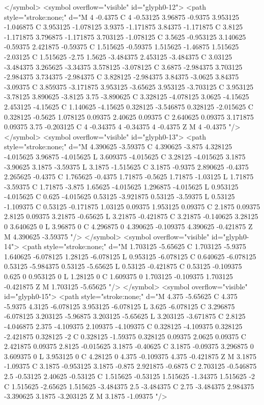 </symbol>
<symbol overflow="visible" id="glyph0-12">
<path style="stroke:none;" d="M 4 -0.4375 C 4 -0.53125 3.96875 -0.9375 3.953125 -1.046875 C 3.953125 -1.078125 3.9375 -1.171875 3.84375 -1.171875 C 3.8125 -1.171875 3.796875 -1.171875 3.703125 -1.078125 C 3.5625 -0.953125 3.140625 -0.59375 2.421875 -0.59375 C 1.515625 -0.59375 1.515625 -1.46875 1.515625 -2.03125 C 1.515625 -2.75 1.5625 -3.484375 2.453125 -3.484375 C 3.03125 -3.484375 3.265625 -3.34375 3.578125 -3.078125 C 3.6875 -2.984375 3.703125 -2.984375 3.734375 -2.984375 C 3.828125 -2.984375 3.84375 -3.0625 3.84375 -3.09375 C 3.859375 -3.171875 3.953125 -3.65625 3.953125 -3.703125 C 3.953125 -3.78125 3.890625 -3.8125 3.75 -3.890625 C 3.328125 -4.078125 3.0625 -4.15625 2.453125 -4.15625 C 1.140625 -4.15625 0.328125 -3.546875 0.328125 -2.015625 C 0.328125 -0.5625 1.078125 0.09375 2.40625 0.09375 C 2.640625 0.09375 3.171875 0.09375 3.75 -0.203125 C 4 -0.34375 4 -0.34375 4 -0.4375 Z M 4 -0.4375 "/>
</symbol>
<symbol overflow="visible" id="glyph0-13">
<path style="stroke:none;" d="M 4.390625 -3.59375 C 4.390625 -3.875 4.328125 -4.015625 3.96875 -4.015625 L 3.609375 -4.015625 C 3.28125 -4.015625 3.1875 -3.90625 3.1875 -3.59375 L 3.1875 -1.515625 C 3.1875 -0.9375 2.890625 -0.4375 2.265625 -0.4375 C 1.765625 -0.4375 1.71875 -0.5625 1.71875 -1.03125 L 1.71875 -3.59375 C 1.71875 -3.875 1.65625 -4.015625 1.296875 -4.015625 L 0.953125 -4.015625 C 0.625 -4.015625 0.53125 -3.921875 0.53125 -3.59375 L 0.53125 -1.109375 C 0.53125 -0.171875 1.03125 0.09375 1.953125 0.09375 C 2.1875 0.09375 2.8125 0.09375 3.21875 -0.65625 L 3.21875 -0.421875 C 3.21875 -0.140625 3.28125 0 3.640625 0 L 3.96875 0 C 4.296875 0 4.390625 -0.109375 4.390625 -0.421875 Z M 4.390625 -3.59375 "/>
</symbol>
<symbol overflow="visible" id="glyph0-14">
<path style="stroke:none;" d="M 1.703125 -5.65625 C 1.703125 -5.9375 1.640625 -6.078125 1.28125 -6.078125 L 0.953125 -6.078125 C 0.640625 -6.078125 0.53125 -5.984375 0.53125 -5.65625 L 0.53125 -0.421875 C 0.53125 -0.109375 0.625 0 0.953125 0 L 1.28125 0 C 1.609375 0 1.703125 -0.109375 1.703125 -0.421875 Z M 1.703125 -5.65625 "/>
</symbol>
<symbol overflow="visible" id="glyph0-15">
<path style="stroke:none;" d="M 4.375 -5.65625 C 4.375 -5.9375 4.3125 -6.078125 3.953125 -6.078125 L 3.625 -6.078125 C 3.296875 -6.078125 3.203125 -5.96875 3.203125 -5.65625 L 3.203125 -3.671875 C 2.8125 -4.046875 2.375 -4.109375 2.109375 -4.109375 C 0.328125 -4.109375 0.328125 -2.421875 0.328125 -2 C 0.328125 -1.59375 0.328125 0.09375 2.0625 0.09375 C 2.421875 0.09375 2.8125 -0.015625 3.1875 -0.40625 C 3.1875 -0.09375 3.296875 0 3.609375 0 L 3.953125 0 C 4.28125 0 4.375 -0.109375 4.375 -0.421875 Z M 3.1875 -1.09375 C 3.1875 -0.953125 3.1875 -0.875 2.921875 -0.6875 C 2.703125 -0.546875 2.5 -0.53125 2.40625 -0.53125 C 1.515625 -0.53125 1.515625 -1.34375 1.515625 -2 C 1.515625 -2.65625 1.515625 -3.484375 2.5 -3.484375 C 2.75 -3.484375 2.984375 -3.390625 3.1875 -3.203125 Z M 3.1875 -1.09375 "/>
